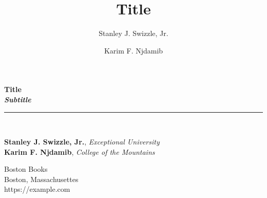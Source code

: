 \documentclass{book}
\title{Title}
\author{Stanley J. Swizzle, Jr. \and Karim F. Njdamib}
\begin{document}
\frontmatter

\begin{titlepage}
\begin{flushleft}

\textbf{\fontsize{48}{54}\selectfont Title \\}
\textbf{\large \textit{Subtitle}}

\par\noindent\rule{\textwidth}{4pt}\\

\begin{flushright}

      \textbf{Stanley J. Swizzle, Jr.}, \emph{Exceptional University}\\
      \textbf{Karim F. Njdamib}, \emph{College of the Mountains}\\
  
\end{flushright}

\vspace{\fill}

\end{flushleft}

\begin{center}
  \small{Boston Books\\
  Boston, Massachusettes\\
  https://example.com}
\end{center}
  
\end{titlepage}
\restoregeometry

\thispagestyle{empty}
\end{document}
